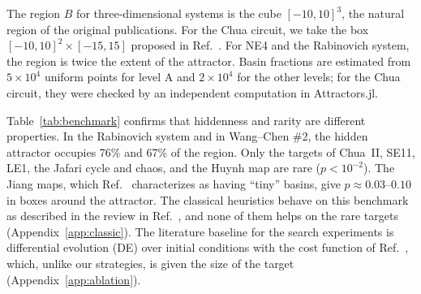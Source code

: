 The region $B$ for three-dimensional systems is the cube $[-10,10]^3$, the natural region of the original publications. For the Chua circuit, we take the box $[-10,10]^2\times[-15,15]$ proposed in Ref.~. For NE4 and the Rabinovich system, the region is twice the extent of the attractor. Basin fractions are estimated from $5\times10^4$ uniform points for level A and $2\times10^4$ for the other levels; for the Chua circuit, they were checked by an independent computation in Attractors.jl.\cite{Datseris2018JOSS,DatserisWagemakers2022}

Table~\ref{tab:benchmark} confirms that hiddenness and rarity are different properties. In the Rabinovich system and in Wang--Chen \#2, the hidden attractor occupies 76\% and 67\% of the region. Only the targets of Chua~II, SE11, LE1, the Jafari cycle and chaos, and the Huynh map are rare ($p<10^{-2}$). The Jiang maps, which Ref.~ characterizes as having ``tiny'' basins, give $p\approx0.03$--$0.10$ in boxes around the attractor. The classical heuristics behave on this benchmark as described in the review in Ref.~, and none of them helps on the rare targets (Appendix~\ref{app:classic}). The literature baseline for the search experiments is differential evolution (DE) over initial conditions with the cost function of Ref.~, which, unlike our strategies, is given the size of the target (Appendix~\ref{app:ablation}).

